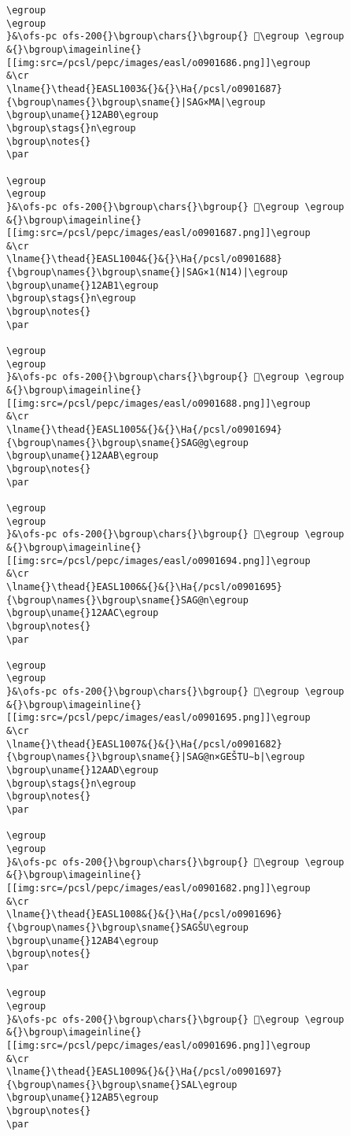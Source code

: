 \begin{verbatim}
\egroup
\egroup
}&\ofs-pc ofs-200{}\bgroup\chars{}\bgroup{} 󲷡\egroup \egroup
&{}\bgroup\imageinline{}[[img:src=/pcsl/pepc/images/easl/o0901686.png]]\egroup
&\cr
\lname{}\thead{}EASL1003&{}&{}\Ha{/pcsl/o0901687}{\bgroup\names{}\bgroup\sname{}|SAG×MA|\egroup
\bgroup\uname{}12AB0\egroup
\bgroup\stags{}n\egroup
\bgroup\notes{}
\par 

\egroup
\egroup
}&\ofs-pc ofs-200{}\bgroup\chars{}\bgroup{} 𒪰\egroup \egroup
&{}\bgroup\imageinline{}[[img:src=/pcsl/pepc/images/easl/o0901687.png]]\egroup
&\cr
\lname{}\thead{}EASL1004&{}&{}\Ha{/pcsl/o0901688}{\bgroup\names{}\bgroup\sname{}|SAG×1(N14)|\egroup
\bgroup\uname{}12AB1\egroup
\bgroup\stags{}n\egroup
\bgroup\notes{}
\par 

\egroup
\egroup
}&\ofs-pc ofs-200{}\bgroup\chars{}\bgroup{} 𒪱\egroup \egroup
&{}\bgroup\imageinline{}[[img:src=/pcsl/pepc/images/easl/o0901688.png]]\egroup
&\cr
\lname{}\thead{}EASL1005&{}&{}\Ha{/pcsl/o0901694}{\bgroup\names{}\bgroup\sname{}SAG@g\egroup
\bgroup\uname{}12AAB\egroup
\bgroup\notes{}
\par 

\egroup
\egroup
}&\ofs-pc ofs-200{}\bgroup\chars{}\bgroup{} 𒪫\egroup \egroup
&{}\bgroup\imageinline{}[[img:src=/pcsl/pepc/images/easl/o0901694.png]]\egroup
&\cr
\lname{}\thead{}EASL1006&{}&{}\Ha{/pcsl/o0901695}{\bgroup\names{}\bgroup\sname{}SAG@n\egroup
\bgroup\uname{}12AAC\egroup
\bgroup\notes{}
\par 

\egroup
\egroup
}&\ofs-pc ofs-200{}\bgroup\chars{}\bgroup{} 𒪬\egroup \egroup
&{}\bgroup\imageinline{}[[img:src=/pcsl/pepc/images/easl/o0901695.png]]\egroup
&\cr
\lname{}\thead{}EASL1007&{}&{}\Ha{/pcsl/o0901682}{\bgroup\names{}\bgroup\sname{}|SAG@n×GEŠTU∼b|\egroup
\bgroup\uname{}12AAD\egroup
\bgroup\stags{}n\egroup
\bgroup\notes{}
\par 

\egroup
\egroup
}&\ofs-pc ofs-200{}\bgroup\chars{}\bgroup{} 𒪭\egroup \egroup
&{}\bgroup\imageinline{}[[img:src=/pcsl/pepc/images/easl/o0901682.png]]\egroup
&\cr
\lname{}\thead{}EASL1008&{}&{}\Ha{/pcsl/o0901696}{\bgroup\names{}\bgroup\sname{}SAGŠU\egroup
\bgroup\uname{}12AB4\egroup
\bgroup\notes{}
\par 

\egroup
\egroup
}&\ofs-pc ofs-200{}\bgroup\chars{}\bgroup{} 𒪴\egroup \egroup
&{}\bgroup\imageinline{}[[img:src=/pcsl/pepc/images/easl/o0901696.png]]\egroup
&\cr
\lname{}\thead{}EASL1009&{}&{}\Ha{/pcsl/o0901697}{\bgroup\names{}\bgroup\sname{}SAL\egroup
\bgroup\uname{}12AB5\egroup
\bgroup\notes{}
\par 


\end{verbatim}
